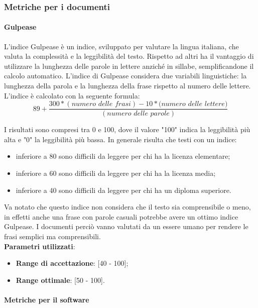 \documentclass[12pt,a4paper,titlepage]{article}
\begin{document}
		\subsubsection{Metriche per i documenti}
			\paragraph{Gulpease}
			L'indice Gulpease è un indice, sviluppato per valutare la lingua italiana, che valuta la complessità e la leggibilità del testo. Rispetto ad altri ha il vantaggio di utilizzare la lunghezza delle parole in lettere anziché in sillabe, semplificandone il calcolo automatico. L'indice di Gulpease considera due variabili linguistiche: la lunghezza della parola e la lunghezza della frase rispetto al numero delle lettere.\\
			L'indice è calcolato con la seguente formula:
			\[89+\frac{300*(\textit{numero delle frasi})-10*(\textit{numero delle lettere)}}{(\textit{numero delle parole})}\]
			
			I risultati sono compresi tra 0 e 100, dove il valore "100" indica la leggibilità più alta e "0" la leggibilità più bassa. In generale risulta che testi con un indice:
			\begin{itemize}
				\item inferiore a 80 sono difficili da leggere per chi ha la licenza elementare;
				\item inferiore a 60 sono difficili da leggere per chi ha la licenza media;
				\item inferiore a 40 sono difficili da leggere per chi ha un diploma superiore.
			\end{itemize}
			Va notato che questo indice non considera che il testo sia comprensibile o meno, in effetti anche una frase con parole casuali potrebbe avere un ottimo indice Gulpease. I documenti perciò vanno valutati da un essere umano per rendere le frasi semplici ma comprensibili.\\
			\textbf{Parametri utilizzati}:
			\begin{itemize}
				\item \textbf{Range di accettazione}: [40 - 100];
				\item \textbf{Range ottimale}: [50 - 100].
			\end{itemize}
		
			\paragraph{Metriche per il software}
			
\end{document}
